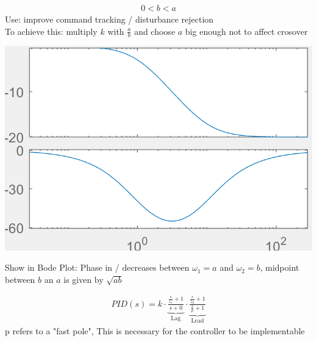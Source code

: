     \begin{minipage}{0.49\linewidth}
        \begin{align*}
            0 < b < a
        \end{align*}
        Use: improve command tracking / disturbance rejection\\
        To achieve this: multiply $k$ with $\frac{a}{b}$ and choose $a$ big enough not to affect crosover
    \end{minipage}
    \begin{minipage}{0.49\linewidth}
        \includegraphics[width = \linewidth]{src/images/lag-controller.png}
    \end{minipage}

    Show in Bode Plot: Phase in / decreases between $\omega_1 = a$ and $\omega_2 = b$, midpoint between $b$ an $a$ is given by $\sqrt{ab}$ 

        \begin{align*}
            PID(s) = k \cdot \underbrace{\frac{\frac{s}{z_1} + 1}{s + 0}}_{\text{Lag}} \cdot \underbrace{\frac{\frac{s}{z_2} + 1}{\frac{s}{p} + 1}}_{\text{Lead}}
        \end{align*}
        p refers to a "fast pole", This is necessary for the controller to be implementable